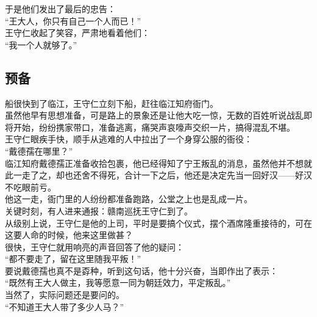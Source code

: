 \begin{multicols}{\theparacolNo}
于是他们发出了最后的忠告：\\

“王大人，你只有自己一个人而已！”\\

王守仁收起了笑容，严肃地看着他们：\\

“我一个人就够了。”\\

\subsection{预备}
船很快到了临江，王守仁立刻下船，赶往临江知府衙门。\\

虽然他早有思想准备，可是路上的景象还是让他大吃一惊，无数的百姓听说战乱即将开始，纷纷携家带口，准备逃离，痛哭声哀嚎声交织一片，搞得混乱不堪。\\

王守仁眼疾手快，顺手从逃难的人中拉出了一个身穿公服的衙役：\\

“戴德孺在哪里？”\\

临江知府戴德孺正准备收拾包裹，他已经得知了宁王叛乱的消息，虽然他并不想就此一走了之，却也还舍不得死，合计一下之后，他还是决定先当一回好汉——好汉不吃眼前亏。\\

他这一走，衙门里的人纷纷都准备跑路，公堂之上也是乱成一片。\\

关键时刻，有人进来通报：赣南巡抚王守仁到了。\\

从级别上说，王守仁是他的上司，平时是要搞个仪式，摆个酒席隆重接待的，可在这要人命的时候，他来这里做甚？\\

很快，王守仁就用响亮的声音回答了他的疑问：\\

“都不要走了，留在这里随我平叛！”\\

要说戴德孺也真不是孬种，听到这句话，他十分兴奋，当即作出了表示：\\

“既然有王大人做主，我等愿意一同为朝廷效力，平定叛乱。”\\

当然了，实际问题还是要问的。\\

“不知道王大人带了多少人马？”\\


\end{multicols}
